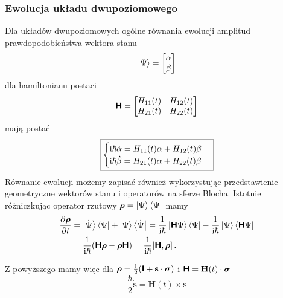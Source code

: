 \documentclass{myclass}
\begin{document}
\subsubsection{Ewolucja układu dwupoziomowego}

Dla układów dwupoziomowych ogólne równania ewolucji amplitud prawdopodobieństwa wektora stanu
\begin{equation*}
    \ket{\Psi} = \mqty[\alpha \\ \beta]
\end{equation*}
dla hamiltonianu postaci
\begin{equation*}
    \oper{H} = \mqty[H_{11}(t) & H_{12}(t) \\ H_{21}(t) & H_{22}(t)]
\end{equation*}
mają postać
\begin{equation*}\boxed{
    \begin{cases}
        \mathrm{i}\hbar\dot{\alpha} = H_{11}(t)\alpha + H_{12}(t)\beta\\
        \mathrm{i}\hbar\dot{\beta}  = H_{21}(t)\alpha + H_{22}(t)\beta
    \end{cases}}
\end{equation*}
Równanie ewolucji możemy zapisać również wykorzystując przedstawienie geometryczne wektorów stanu i
operatorów na sferze Blocha. Istotnie różniczkując operator rzutowy \(\boldsymbol{\mathsf{\rho}} =
\ket{\Psi}\bra{\Psi}\) mamy
\begin{equation*}
    \begin{split}
        \pdv{\boldsymbol{\mathsf{\rho}}}{t} &= \ket{\dot{\Psi}}\bra{\Psi} + \ket{\Psi}\bra{\dot{\Psi}} = \frac{1}{\mathrm{i}\hbar}\ket{\boldsymbol{\mathsf{H}}\Psi}\bra{\Psi} - \frac{1}{\mathrm{i}\hbar}\ket{\Psi}\bra{\boldsymbol{\mathsf{H}}\Psi}\\
        &=\frac{1}{\mathrm{i}\hbar}(\boldsymbol{\mathsf{H}}\boldsymbol{\mathsf{\rho}}-\boldsymbol{\mathsf{\rho}}\boldsymbol{\mathsf{H}}) = \frac{1}{\mathrm{i}\hbar}[\boldsymbol{\mathsf{H}},\boldsymbol{\mathsf{\rho}}]\,.
    \end{split}
\end{equation*}

Z powyższego mamy więc dla \(\boldsymbol{\mathsf{\rho}} = \frac{1}{2}(\boldsymbol{\mathsf{I}} +
\mathbf{s}\cdot\boldsymbol{\sigma})\) i \(\boldsymbol{\mathsf{H}} = \mathbf{H}(t)\cdot\boldsymbol{\sigma}\)
\begin{equation*}\boxed{
    \frac{\hbar}{2}\dot{\mathbf{s}} = \mathbf{H}(t)\times\mathbf{s}}
\end{equation*}
\end{document}
